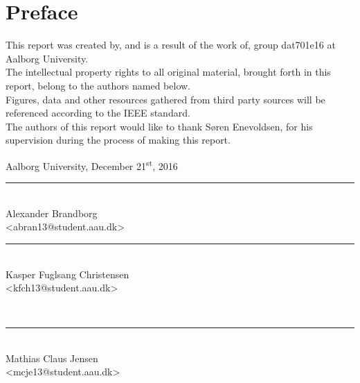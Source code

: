 \chapter*{Preface}\label{ch:preface}
This report was created by, and is a result of the work of, group dat701e16 at Aalborg University. \\
The intellectual property rights to all original material, brought forth in this report, belong to the authors named below.\\
Figures, data and other resources gathered from third party sources will be referenced according to the IEEE standard. \\

The authors of this report would like to thank Søren Enevoldsen, for his supervision during the process of making this report.

\vspace{\baselineskip}\hfill Aalborg University, December 21\textsuperscript{st}, 2016
\vfill

\noindent
\begin{minipage}[b]{0.45\textwidth}
 \centering
 \rule{\textwidth}{0.5pt}\\
  Alexander Brandborg\\
 {\footnotesize <abran13@student.aau.dk>}
\end{minipage}
%
\hfill
%
\begin{minipage}[b]{0.45\textwidth}
 \centering
 \rule{\textwidth}{0.5pt}\\
  Kasper Fuglsang Christensen\\
 {\footnotesize <kfch13@student.aau.dk>}
\end{minipage}
%
\vspace{3\baselineskip}\\
%
\begin{minipage}[b]{0.45\textwidth}
 \centering
 \rule{\textwidth}{0.5pt}\\
  Mathias Claus Jensen\\
 {\footnotesize <mcje13@student.aau.dk>}
\end{minipage}
